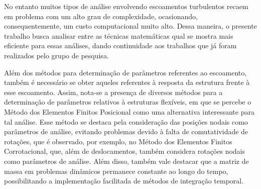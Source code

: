 No entanto muitos tipos de análise envolvendo escoamentos turbulentos recaem em problema com um alto grau de complexidade, ocasionando, consequentemente, um custo computacional muito alto. Dessa maneira, o presente trabalho busca analisar entre as técnicas matemáticas qual se mostra mais eficiente para essas análises, dando continuidade aos trabalhos que já foram realizados pelo grupo de pesquisa.

Além dos métodos para determinação de parâmetros referentes ao escoamento, também é necessário se obter aqueles referentes à resposta da estrutura frente à esse escoamento. Assim, nota-se a presença de diversos métodos para a determinação de parâmetros relativos à estruturas flexíveis, em que se percebe o Método dos Elementos Finitos Posicional como uma alternativa interessante para tal análise. Esse método se destaca pela consideração das posições nodais como parâmetros de análise, evitando problemas devido à falta de comutatividade de rotações, que é observado, por exemplo, no Método dos Elementos Finitos Corrotacional, que, além de deslocamentos, também considera rotações nodais como parâmetros de análise. Além disso, também vale destacar que a matriz de massa em problemas dinâmicos permanece constante ao longo do tempo, possibilitando a implementação facilitada de métodos de integração temporal.